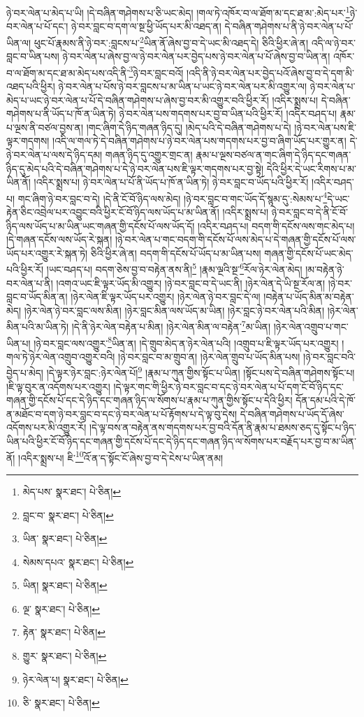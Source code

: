 ཉེ་བར་ལེན་པ་མེད་པ་ཡི། །དེ་བཞིན་གཤེགས་པ་ཅི་ཡང་མེད། །གལ་ཏེ་འཁོར་བ་ལ་ཐོག་མ་དང་ཐ་མ་:མེད་པར་\footnote{མེད་པས་  སྣར་ཐང་།  པེ་ཅིན། }ཉེ་བར་ལེན་པ་པོ་དང་། ཉེ་བར་བླང་བ་དག་ལ་སྔ་ཕྱི་ཡོད་པར་མི་འཐད་ན། དེ་བཞིན་གཤེགས་པ་ནི་ཉེ་བར་ལེན་པ་པོ་ཡིན་ལ། ཕུང་པོ་རྣམས་ནི་ཉེ་བར་:བླངས་པ་\footnote{བླང་བ་  སྣར་ཐང་།  པེ་ཅིན། }ཡིན་ནོ་ཞེས་བྱ་བ་དེ་ཡང་མི་འཐད་དེ། ཅིའི་ཕྱིར་ཞེ་ན། འདི་ལ་ཉེ་བར་བླང་བ་ཡིན་པས། ཉེ་བར་ལེན་པ་ཞེས་བྱ་ལ་ཉེ་བར་ལེན་པར་བྱེད་པས་ཉེ་བར་ལེན་པ་པོ་ཞེས་བྱ་བ་ཡིན་ན། འཁོར་བ་ལ་ཐོག་མ་དང་ཐ་མ་མེད་པས་འདི་ནི་\footnote{ཡིན་  སྣར་ཐང་།  པེ་ཅིན། }ཉེ་བར་བླང་བའོ། །འདི་ནི་ཉེ་བར་ལེན་པར་བྱེད་པའོ་ཞེས་བྱ་བ་དེ་དག་མི་འཐད་པའི་ཕྱིར། ཉེ་བར་ལེན་པ་པོས་ཉེ་བར་བླངས་པ་མ་ཡིན་པ་ཡང་ཉེ་བར་ལེན་པར་མི་འགྱུར་ལ། ཉེ་བར་ལེན་པ་མེད་པ་ཡང་ཉེ་བར་ལེན་པ་པོ་དེ་བཞིན་གཤེགས་པ་ཞེས་བྱ་བར་མི་འགྱུར་བའི་ཕྱིར་རོ། །འདིར་སྨྲས་པ། དེ་བཞིན་གཤེགས་པ་ནི་ཡོད་པ་ཁོ་ན་ཡིན་ཏེ། ཉེ་བར་ལེན་པས་གདགས་པར་བྱ་བ་ཡིན་པའི་ཕྱིར་རོ། །འདིར་བཤད་པ། རྣམ་པ་ལྔས་ནི་བཙལ་བྱས་ན། །གང་ཞིག་དེ་ཉིད་གཞན་ཉིད་དུ། །མེད་པའི་དེ་བཞིན་གཤེགས་པ་དེ། །ཉེ་བར་ལེན་པས་ཇི་ལྟར་གདགས། །འདི་ལ་གལ་ཏེ་དེ་བཞིན་གཤེགས་པ་ཉེ་བར་ལེན་པས་གདགས་པར་བྱ་བ་ཞིག་ཡོད་པར་གྱུར་ན། དེ་ཉེ་བར་ལེན་པ་ལས་དེ་ཉིད་དམ། གཞན་ཉིད་དུ་འགྱུར་གྲང་ན། རྣམ་པ་ལྔས་བཙལ་ན་གང་ཞིག་དེ་ཉིད་དང་གཞན་ཉིད་དུ་མེད་པའི་དེ་བཞིན་གཤེགས་པ་དེ་ཉེ་བར་ལེན་པས་ཇི་ལྟར་གདགས་པར་བྱ་སྟེ། དེའི་ཕྱིར་དེ་ཡང་རིགས་པ་མ་ཡིན་ནོ། །འདིར་སྨྲས་པ། ཉེ་བར་ལེན་པ་པོ་ནི་ཡོད་པ་ཁོ་ན་ཡིན་ཏེ། ཉེ་བར་བླང་བ་ཡོད་པའི་ཕྱིར་རོ། །འདིར་བཤད་པ། གང་ཞིག་ཉེ་བར་བླང་བ་དེ། །དེ་ནི་ངོ་བོ་ཉིད་ལས་མེད། །ཉེ་བར་བླང་བ་གང་ཡོད་དོ་སྙམ་དུ་:སེམས་པ་\footnote{སེམས་དཔའ་  སྣར་ཐང་།  པེ་ཅིན། }དེ་ཡང་རྟེན་ཅིང་འབྲེལ་པར་འབྱུང་བའི་ཕྱིར་ངོ་བོ་ཉིད་ལས་ཡོད་པ་མ་ཡིན་ནོ། །འདིར་སྨྲས་པ། ཉེ་བར་བླང་བ་དེ་ནི་ངོ་བོ་ཉིད་ལས་ཡོད་པ་མ་ཡིན་ཡང་གཞན་གྱི་དངོས་པོ་ལས་ཡོད་དོ། །འདིར་བཤད་པ། བདག་གི་དངོས་ལས་གང་མེད་པ། །དེ་གཞན་དངོས་ལས་ཡོད་རེ་སྐན། །ཉེ་བར་ལེན་པ་གང་བདག་གི་དངོས་པོ་ལས་མེད་པ་དེ་གཞན་གྱི་དངོས་པོ་ལས་ཡོད་པར་འགྱུར་རེ་སྐན་ཏེ། ཅིའི་ཕྱིར་ཞེ་ན། བདག་གི་དངོས་པོ་ཡོད་པ་མ་ཡིན་པས། གཞན་གྱི་དངོས་པོ་ཡང་མེད་པའི་ཕྱིར་རོ། །ཡང་བཤད་པ། བདག་ཅེས་བྱ་བ་བརྟེན་ནས་ནི།\footnote{ཡིན།  སྣར་ཐང་།  པེ་ཅིན། } །རྣམ་ལྔའི་སྔ་\footnote{ལྔ་  སྣར་ཐང་།  པེ་ཅིན། }རོལ་ཉེར་ལེན་མེད། །མ་བརྟེན་ཉེ་བར་ལེན་པ་ནི། །འགའ་ཡང་ཇི་ལྟར་ཡོད་མི་འགྱུར། །ཉེ་བར་བླང་བ་དེ་ཡང་ནི། །ཉེར་ལེན་དེ་ཡི་སྔ་རོལ་ན། །ཉེ་བར་བླང་བ་ཡོད་མིན་ན། །ཉེར་ལེན་ཇི་ལྟར་ཡོད་པར་འགྱུར། །ཉེར་ལེན་ཉེ་བར་བླང་དེ་ལ། །བརྟེན་པ་ཡོད་མིན་མ་བརྟེན་མེད། །ཉེར་ལེན་ཉེ་བར་བླང་ལས་མིན། །ཉེར་བླང་མིན་ལས་ཡོད་མ་ཡིན། །ཉེར་བླང་ཉེ་བར་ལེན་པའི་མིན། །ཉེར་ལེན་མིན་པའི་མ་ཡིན་ཏེ། །དེ་ནི་ཉེར་ལེན་བརྟེན་པ་མིན། །ཉེར་ལེན་མིན་ལ་བརྟེན་\footnote{རྟེན་  སྣར་ཐང་།  པེ་ཅིན། }མ་ཡིན། །ཉེར་ལེན་འགྲུབ་པ་གང་ཡིན་པ། །ཉེ་བར་བླང་ལས་འགྱུར་\footnote{གྱུར་  སྣར་ཐང་།  པེ་ཅིན། }ཡིན་ན། །དེ་གྲུབ་མེད་ན་ཉེར་ལེན་པའི། །འགྲུབ་པ་ཇི་ལྟར་ཡོད་པར་འགྱུར། །གལ་ཏེ་ཉེར་ལེན་འགྲུབ་འགྱུར་བའི། །ཉེ་བར་བླང་བ་མ་གྲུབ་ན། །ཉེར་ལེན་གྲུབ་པ་ཡོད་མིན་པས། །ཉེ་བར་བླང་བའི་བྱེད་པ་མེད། །དེ་ལྟར་ཉེར་བླང་:ཉེར་ལེན་པོ།\footnote{ཉེར་ལེན་པ།  སྣར་ཐང་།  པེ་ཅིན། } །རྣམ་པ་ཀུན་གྱིས་སྟོང་པ་ཡིན། །སྟོང་པས་དེ་བཞིན་གཤེགས་སྟོང་པ། །ཇི་ལྟ་བུར་ན་འདོགས་པར་འགྱུར། །དེ་ལྟར་གང་གི་ཕྱིར་ཉེ་བར་བླང་བ་དང་ཉེ་བར་ལེན་པ་པོ་དག་ངོ་བོ་ཉིད་དང་གཞན་གྱི་དངོས་པོ་དང་དེ་ཉིད་དང་གཞན་ཉིད་ལ་སོགས་པ་རྣམ་པ་ཀུན་གྱིས་སྟོང་པ་དེའི་ཕྱིར། དོན་དམ་པའི་དེ་ཁོ་ན་མཐོང་བ་དག་ཉེ་བར་བླང་བ་དང་ཉེ་བར་ལེན་པ་པོ་རྟོགས་པ་དེ་ལྟ་བུ་དེས། དེ་བཞིན་གཤེགས་པ་ཡོད་དོ་ཞེས་འདོགས་པར་མི་འགྱུར་རོ། །དེ་ལྟ་བས་ན་བརྟེན་ནས་གདགས་པར་བྱ་བའི་དོན་ནི་རྣམ་པ་ཐམས་ཅད་དུ་སྟོང་པ་ཉིད་ཡིན་པའི་ཕྱིར་ངོ་བོ་ཉིད་དང་གཞན་གྱི་དངོས་པོ་དང་དེ་ཉིད་དང་གཞན་ཉིད་ལ་སོགས་པར་བརྗོད་པར་བྱ་བ་མ་ཡིན་ནོ། །འདིར་སྨྲས་པ། ཇི་\footnote{ཅི་  སྣར་ཐང་།  པེ་ཅིན། }འོ་ན་ད་སྟོང་ངོ་ཞེས་བྱ་བ་དེ་ངེས་པ་ཡིན་ནམ། 
